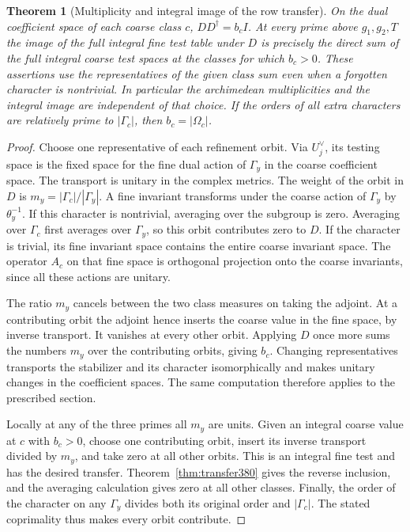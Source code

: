 \documentclass[a4paper,11pt]{article}
\newtheorem{theorem}[proposition]{Theorem}
\theoremstyle{definition}
\theoremstyle{remark}
\numberwithin{equation}{section}
\begin{document}
\begin{theorem}[Multiplicity and integral image of the row transfer]
\leavevmode\label{thm:fiberlength380}
On the dual coefficient space of each coarse class \(c\),
\(DD^\dagger=b_cI\). At every prime above \(g_1,g_2,T\)
the image of the full integral fine test table under \(D\)
is precisely the direct sum of the full integral coarse test
spaces at the classes for which \(b_c>0\). These assertions
use the representatives of the given class sum even when
a forgotten character is nontrivial. In particular the
archimedean multiplicities and the integral image are
independent of that choice. If the orders of all extra
characters are relatively prime to \(|\Gamma_c|\), then
\(b_c=|\Omega_c|\).
\end{theorem}
\begin{proof}
Choose one representative of each refinement orbit. Via
\(U_j^\vee\), its testing space is the fixed space for the
fine dual action of \(\Gamma_y\) in the coarse coefficient
space. The transport is unitary in the complex metrics. The
weight of the orbit in \(D\) is
\(m_y=|\Gamma_c|/|\Gamma_y|\). A fine invariant transforms
under the coarse action of \(\Gamma_y\) by \(\theta_y^{-1}\).
If this character is nontrivial, averaging over the subgroup
is zero. Averaging over \(\Gamma_c\) first averages over
\(\Gamma_y\), so this orbit contributes zero to \(D\).
If the character is trivial, its fine invariant space contains
the entire coarse invariant space. The operator \(A_c\) on
that fine space is orthogonal projection onto the coarse
invariants, since all these actions are unitary.

The ratio \(m_y\) cancels between the two class measures on
taking the adjoint. At a contributing orbit the adjoint hence
inserts the coarse value in the fine space, by inverse
transport. It vanishes at every other orbit. Applying \(D\)
once more sums the numbers \(m_y\) over the contributing
orbits, giving \(b_c\). Changing representatives transports
the stabilizer and its character isomorphically and makes
unitary changes in the coefficient spaces. The same computation
therefore applies to the prescribed section.

Locally at any of the three primes all \(m_y\) are units.
Given an integral coarse value at \(c\) with \(b_c>0\),
choose one contributing orbit, insert its inverse transport
divided by \(m_y\), and take zero at all other orbits.
This is an integral fine test and has the desired transfer.
Theorem~\ref{thm:transfer380} gives the reverse inclusion,
and the averaging calculation gives zero at all other classes.
Finally, the order of the character on any \(\Gamma_y\) divides
both its original order and \(|\Gamma_c|\). The stated
coprimality thus makes every orbit contribute.
\end{proof}
\end{document}
